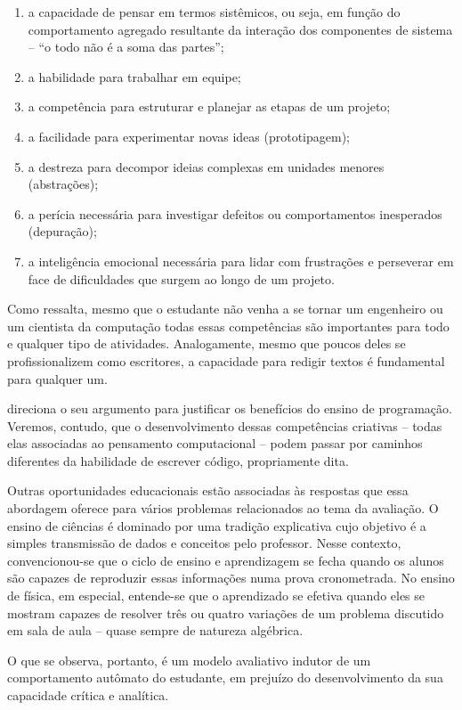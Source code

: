 \begin{enumerate}
  \item a capacidade de pensar em termos sistêmicos, ou seja, em função do comportamento agregado resultante da interação dos componentes de sistema -- ``o todo não é a soma das partes''; 
  \item a habilidade para trabalhar em equipe;
  \item a competência para estruturar e planejar as etapas de um projeto;
  \item a facilidade para experimentar novas ideas (prototipagem); 
  \item a destreza para decompor ideias complexas em unidades menores (abstrações);
  \item a perícia necessária para investigar defeitos ou comportamentos inesperados (depuração);
  \item a inteligência emocional necessária para lidar com frustrações e perseverar em face de dificuldades que surgem ao longo de um projeto.  
\end{enumerate}

Como ressalta, mesmo que o estudante não venha a se tornar um engenheiro ou um cientista da computação todas essas competências são importantes para todo e qualquer tipo de atividades. Analogamente, mesmo que poucos deles se profissionalizem como escritores, a capacidade para redigir textos é fundamental para qualquer um.

 direciona o seu argumento para justificar os benefícios do ensino de programação. Veremos, contudo, que o desenvolvimento dessas competências criativas -- todas elas associadas ao pensamento computacional -- podem passar por caminhos diferentes da habilidade de escrever código, propriamente dita. 

Outras oportunidades educacionais estão associadas às respostas que essa abordagem oferece para vários problemas relacionados ao tema da avaliação. O ensino de ciências é dominado por uma tradição explicativa cujo objetivo é a simples transmissão de dados e conceitos pelo professor. Nesse contexto, convencionou-se que o ciclo de ensino e aprendizagem se fecha quando os alunos são capazes de reproduzir essas informações numa prova cronometrada. No ensino de física, em especial, entende-se que o aprendizado se efetiva quando eles se mostram capazes de resolver três ou quatro variações de um problema  discutido em sala de aula -- quase sempre de natureza algébrica. 

O que se observa, portanto, é um modelo avaliativo indutor de um comportamento autômato do estudante, em prejuízo do desenvolvimento da sua capacidade crítica e analítica.


